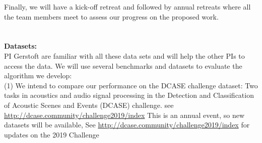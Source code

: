 \documentclass{article}
\begin{document}
Finally, we will have a kick-off retreat and followed by annual retreats where all the team members meet to assess our progress on the proposed work.
\\
\\
\\
{\bf Datasets:}\\
PI Gerstoft are familiar with all these data sets and will help the other PIs to access the data.
We will use several benchmarks and datasets to evaluate the algorithm we develop:\\
(1) We intend to compare our performance on the DCASE challenge dataset\cite{mesaros2017dcase}: Two tasks in acoustics and audio signal processing in the  Detection and Classification of Acoustic Scenes and Events (DCASE) challenge. see \href{http://dcase.community/challenge2019/index}{http://dcase.community/challenge2019/index}
This is an annual event, so new datasets will be available, See \href{http://dcase.community/challenge2019/index}{http://dcase.community/challenge2019/index} for updates on the 2019 Challenge
\end{document}
